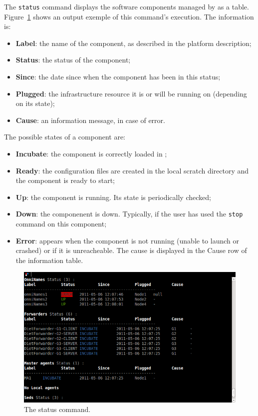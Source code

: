 The \verb+status+ command displays the software components managed by \godiet as a table. Figure~\ref{fig:GODIETStatus} shows an output exemple of this command's execution.
The information is:
\begin{itemize}
\item \textbf{Label}: the name of the component, as described in the \diet platform description;
\item \textbf{Status}: the status of the component;
\item \textbf{Since}: the date since when the component has been in this status;
\item \textbf{Plugged}: the infrastructure resource it is or will be running on (depending on its state);
\item \textbf{Cause}: an information message, in case of error.
\end{itemize} 

\vspace{1cm}
The possible states of a component are:
\begin{itemize}
 \item \textbf{Incubate}: the component is correctly loaded in \godiet;
 \item \textbf{Ready}: the configuration files are created in the local scratch directory and the component is ready to start;
 \item \textbf{Up}: the component is running. Its state is periodically checked;
 \item \textbf{Down}: the componenent is down. Typically, if the \godiet user has used the \verb+stop+ command on this component;
 \item \textbf{Error}: appears when the component is not running (unable to launch or crashed) or if it is unreacheable. The cause is displayed in the Cause row of the information table.  
\end{itemize}

\begin{figure}[h]
  \centering
  \includegraphics[width=12cm]{fig/6-StatusWithErrUpIncubate}
  \caption{The status command.\label{fig:GODIETStatus}}
\end{figure}

